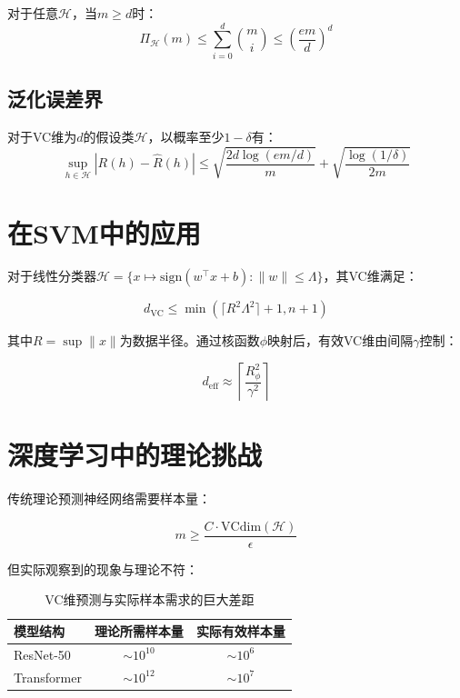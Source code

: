 \documentclass{article}
\begin{document}
\begin{theorem}[Sauer引理]
对于任意$\mathcal{H}$，当$m \geq d$时：
\begin{equation}
\Pi_\mathcal{H}(m) \leq \sum_{i=0}^d \binom{m}{i} \leq \left(\frac{em}{d}\right)^d
\end{equation}
\end{theorem}

\subsection{泛化误差界}
\begin{theorem}
对于VC维为$d$的假设类$\mathcal{H}$，以概率至少$1-\delta$有：
\begin{equation}
\sup_{h\in\mathcal{H}} |R(h) - \hat{R}(h)| \leq \sqrt{\frac{2d\log(em/d)}{m}} + \sqrt{\frac{\log(1/\delta)}{2m}}
\end{equation}
\end{theorem}

\section{在SVM中的应用}
\label{sec:svm}

对于线性分类器$\mathcal{H} = \{x \mapsto \text{sign}(w^\top x + b): \|w\| \leq \Lambda\}$，其VC维满足：

\begin{equation}
d_{\text{VC}} \leq \min\left(\lceil R^2\Lambda^2 \rceil + 1, n+1\right)
\end{equation}

其中$R = \sup\|x\|$为数据半径。通过核函数$\phi$映射后，有效VC维由间隔$\gamma$控制：

\begin{equation}
d_{\text{eff}} \approx \left\lceil \frac{R_\phi^2}{\gamma^2} \right\rceil
\end{equation}

\section{深度学习中的理论挑战}
\label{sec:dl}

传统理论预测神经网络需要样本量：

\begin{equation}
m \geq \frac{C\cdot\text{VCdim}(\mathcal{H})}{\epsilon}
\end{equation}

但实际观察到的现象与理论不符：

\begin{table}[t]
\centering
\begin{tabular}{lcc}
\toprule
模型结构 & 理论所需样本量 & 实际有效样本量 \\
\midrule
ResNet-50 & $\sim 10^{10}$ & $\sim 10^6$ \\
Transformer & $\sim 10^{12}$ & $\sim 10^7$ \\
\bottomrule
\end{tabular}
\caption{VC维预测与实际样本需求的巨大差距}
\label{tab:gap}
\end{table}
\end{document}
